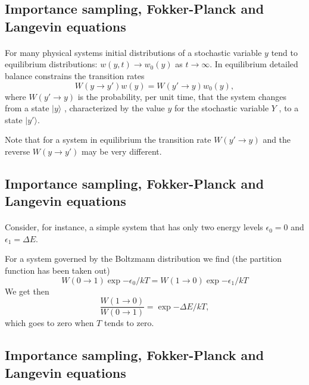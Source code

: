 \documentclass[%
twoside,                 %
final,                   %
10pt]{article}
\begin{document}
{{{{{{%
\subsection{Importance sampling, Fokker-Planck and Langevin equations}

\paragraph{}
     For many physical systems initial distributions of a stochastic 
variable $y$ tend to equilibrium distributions: $w(y, t)\rightarrow w_0(y)$ 
as $t\rightarrow\infty$. In
equilibrium detailed balance constrains the transition rates
\[
     W(y\rightarrow y')w(y ) = W(y'\rightarrow y)w_0 (y),
\]
where $W(y'\rightarrow y)$ 
is the probability, per unit time, that the system changes
from a state $|y\rangle$ , characterized by the value $y$ 
for the stochastic variable $Y$ , to a state $|y'\rangle$.

Note that for a system in equilibrium the transition rate 
$W(y'\rightarrow y)$ and
the reverse $W(y\rightarrow y')$ may be very different.




\subsection{Importance sampling, Fokker-Planck and Langevin equations}

\paragraph{}
Consider, for instance, a simple
system that has only two energy levels $\epsilon_0 = 0$ and 
$\epsilon_1 = \Delta E$. 

For a system governed by the Boltzmann distribution we find (the partition function has been taken out)
\[
     W(0\rightarrow 1)\exp{-\epsilon_0/kT} = W(1\rightarrow 0)\exp{-\epsilon_1/kT}
\]
We get then
\[
     \frac{W(1\rightarrow 0)}{W(0 \rightarrow 1)}=\exp{-\Delta E/kT},
\]
which goes to zero when $T$ tends to zero.




\subsection{Importance sampling, Fokker-Planck and Langevin equations}

}}}}}}
\end{document}
